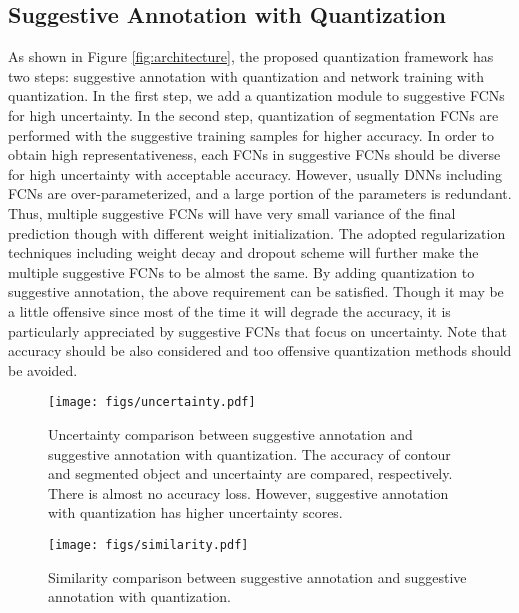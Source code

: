 \documentclass[10pt,twocolumn,letterpaper]{article}
\begin{document}
\subsection{Suggestive Annotation with Quantization}

As shown in Figure \ref{fig:architecture}, the proposed quantization framework has two steps: suggestive annotation with quantization and network training with quantization.
In the first step, we add a quantization module to suggestive FCNs for high uncertainty.
In the second step, quantization of segmentation FCNs are performed with the suggestive training samples for higher accuracy.
In order to obtain high representativeness, each FCNs in suggestive FCNs should be diverse for high uncertainty with acceptable accuracy.
However, usually DNNs including FCNs are over-parameterized, and a large portion of the parameters is redundant.
Thus, multiple suggestive FCNs will have very small variance of the final prediction though with different weight initialization.
The adopted regularization techniques including weight decay and dropout scheme will further make the multiple suggestive FCNs to be almost the same.
By adding quantization to suggestive annotation, the above requirement can be satisfied.
Though it may be a little offensive since most of the time it will degrade the accuracy, it is particularly appreciated by suggestive FCNs that focus on uncertainty.
Note that accuracy should be also considered and too offensive quantization methods should be avoided.
\begin{figure*}[!htbp]
\begin{center}
\centerline{\texttt{[image: figs/uncertainty.pdf]}}
\end{center}
\vspace{-20pt}
   \caption{Uncertainty comparison between suggestive annotation and suggestive annotation with quantization. The accuracy of contour and segmented object and uncertainty are compared, respectively. There is almost no accuracy loss. However, suggestive annotation with quantization has higher uncertainty scores.}
\label{fig:uncertainty}
\end{figure*}

\begin{figure*}[!htbp]
\begin{center}
\centerline{\texttt{[image: figs/similarity.pdf]}}
\end{center}
\vspace{-20pt}
   \caption{Similarity comparison between suggestive annotation and suggestive annotation with quantization.}
\label{fig:similarity}
\end{figure*}
\end{document}
